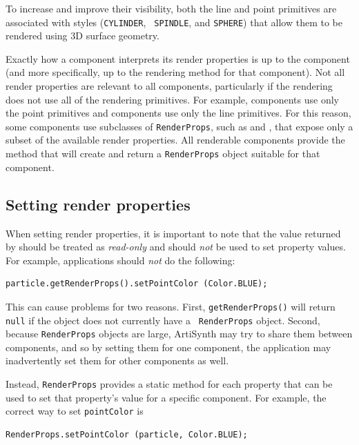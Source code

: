 To increase and improve their visibility, both the line and point
primitives are associated with styles ({\tt CYLINDER}, {\tt
SPINDLE}, and {\tt SPHERE}) that allow them to be rendered using 3D
surface geometry.

Exactly how a component interprets its render properties is up to the
component (and more specifically, up to the rendering method for that
component).  Not all render properties are relevant to all components,
particularly if the rendering does not use all of the rendering
primitives. For example,
 components use only
the point primitives and
 components use only
the line primitives. For this reason, some components use subclasses
of {\tt RenderProps}, such as
 and
, that expose only a subset
of the available render properties. All renderable components provide
the method
 that
will create and return a {\tt RenderProps} object suitable for that
component.

\subsection{Setting render properties}
\label{SettingRenderProperties:sec}

When setting render properties, it is important to note that
the value returned by
should be treated as {\it read-only} and should {\it not}
be used to set property values.
For example, applications should {\it not} do the
following:
\begin{lstlisting}[]
   particle.getRenderProps().setPointColor (Color.BLUE);
\end{lstlisting}
%
This can cause problems for two reasons. First, {\tt getRenderProps()}
will return {\tt null} if the object does not currently have a {\tt
RenderProps} object. Second, because {\tt RenderProps} objects are
large, ArtiSynth may try to share them between components, and so by
setting them for one component, the application may inadvertently set
them for other components as well.

Instead, {\tt RenderProps} provides a static method for each property
that can be used to set that property's value for a specific
component.  For example, the correct way to set {\tt pointColor} is
%
\begin{lstlisting}[]
   RenderProps.setPointColor (particle, Color.BLUE);
\end{lstlisting}
%

